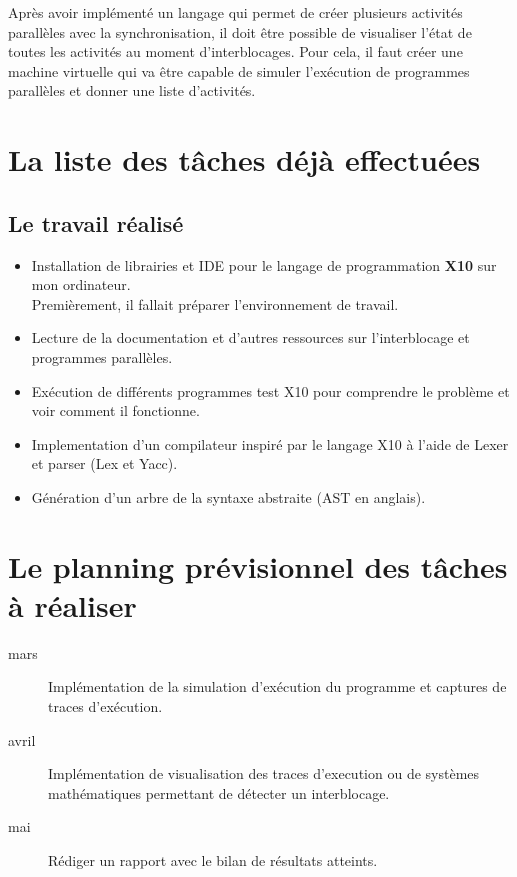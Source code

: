 \documentclass[12pt]{scrartcl}
\begin{document}
 Après avoir implémenté un langage qui permet de créer plusieurs activités parallèles avec la synchronisation, il doit être possible de visualiser l'état de toutes les activités au moment d'interblocages.
 Pour cela, il faut créer une machine virtuelle qui va être capable de simuler l'exécution de programmes parallèles et donner une liste d'activités. \\

 \newpage
 
\section{La liste des tâches déjà effectuées}

\subsection{Le travail réalisé}
\begin{itemize}
 \item Installation de librairies et IDE pour le langage de programmation \textbf{X10} sur mon ordinateur.\\ Premièrement, il fallait préparer l'environnement de travail.
 \item Lecture de la documentation et d'autres ressources sur l'interblocage et programmes parallèles.
 \item Exécution de différents programmes test X10 pour comprendre le problème et voir comment il fonctionne. 
 \item Implementation d'un compilateur inspiré par le langage X10 à l'aide de Lexer et parser (Lex et Yacc).
 \item Génération d'un arbre de la syntaxe abstraite (AST en anglais).
\end{itemize}



\section{Le planning prévisionnel des tâches à réaliser}
\begin{description}
  \item[mars] Implémentation de la simulation d'exécution du programme et captures de traces d'exécution.
  \item[avril] Implémentation de visualisation des traces d'execution ou de systèmes mathématiques permettant de détecter un interblocage.
  \item[mai] Rédiger un rapport avec le bilan de résultats atteints.
\end{description}
\end{document}

